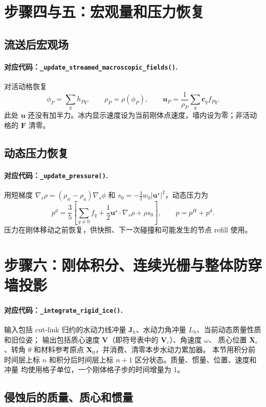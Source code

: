 \documentclass[UTF8,zihao=-4]{ctexart}
\newcommand{\vect}[1]{\boldsymbol{#1}}
\newcommand{\code}[1]{\texttt{#1}}
\newcommand{\stepname}[1]{\paragraph{对应代码：\code{#1}.}}
\numberwithin{equation}{section}
\begin{document}
\section{步骤四与五：宏观量和压力恢复}

\subsection{流送后宏观场}

\stepname{\_update\_streamed\_macroscopic\_fields()}
对活动格恢复
\begin{equation}
  \phi_P=\sum_qh_{Pq},
  \qquad
  \rho_P=\rho(\phi_P),
  \qquad
  \vect u_P=\frac{1}{\rho_P}\sum_q\vect c_qf_{Pq}.
  \label{eq:macro-recovery}
\end{equation}
此处 $\vect u$ 还没有加半力。冰内显示速度设为当前刚体点速度，墙内设为零；非活动格的
$\vect F$ 清零。

\subsection{动态压力恢复}

\stepname{\_update\_pressure()}
用短梯度 $\nabla_s\rho=(\rho_w-\rho_a)\nabla_s\phi$ 和
$s_0=-\tfrac32w_0|\vect u^\star|^2$，动态压力为
\begin{equation}
  p^d=\frac35\left[
  \sum_{q\ne0}f_q+\frac12\vect u^\star\cdot\nabla_s\rho+\rho s_0
  \right],
  \qquad p=p^H+p^d.
  \label{eq:pressure-recovery}
\end{equation}
压力在刚体移动之前恢复，供快照、下一次碰撞和可能发生的节点 refill 使用。

\section{步骤六：刚体积分、连续光栅与整体防穿墙投影}

\stepname{\_integrate\_rigid\_ice()}
输入包括 cut-link 归约的水动力线冲量 $\vect J_h$、水动力角冲量 $L_h$、当前动态质量性质和旧位姿；
输出包括质心速度 $\vect V$（即符号表中的 $\vect V_c$）、角速度 $\omega$、
质心位置 $\vect X_c$、转角 $\theta$ 和材料参考原点 $\vect X_0$，并消费、清零本步水动力累加器。
本节用积分前时间层上标 $n$ 和积分后时间层上标 $n+1$ 区分状态。质量、惯量、位置、速度和冲量
均使用格子单位，一个刚体格子步的时间增量为 1。

\subsection{侵蚀后的质量、质心和惯量}
\end{document}
